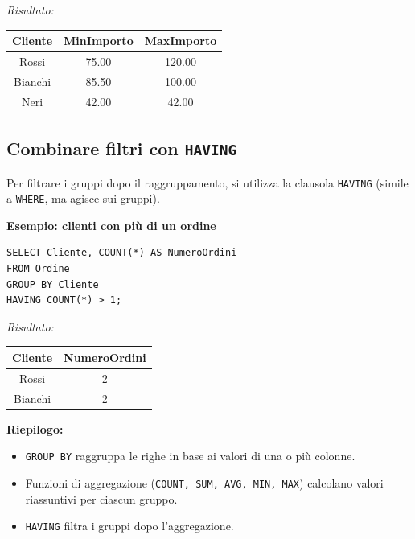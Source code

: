 \documentclass[a4paper,12pt]{article}
\newcommand{\code}[1]{\texttt{#1}}
\begin{document}
\textit{Risultato:}
\begin{center}
\begin{tabular}{|c|c|c|}
\hline
Cliente & MinImporto & MaxImporto \\
\hline
Rossi & 75.00 & 120.00 \\
Bianchi & 85.50 & 100.00 \\
Neri & 42.00 & 42.00 \\
\hline
\end{tabular}
\end{center}

\subsection{Combinare filtri con \code{HAVING}}
Per filtrare i gruppi dopo il raggruppamento, si utilizza la clausola \code{HAVING} (simile a \code{WHERE}, ma agisce sui gruppi).

\textbf{Esempio: clienti con più di un ordine}
\begin{verbatim}
SELECT Cliente, COUNT(*) AS NumeroOrdini
FROM Ordine
GROUP BY Cliente
HAVING COUNT(*) > 1;
\end{verbatim}

\textit{Risultato:}
\begin{center}
\begin{tabular}{|c|c|}
\hline
Cliente & NumeroOrdini \\
\hline
Rossi & 2 \\
Bianchi & 2 \\
\hline
\end{tabular}
\end{center}

\bigskip
\textbf{Riepilogo:}
\begin{itemize}
    \item \code{GROUP BY} raggruppa le righe in base ai valori di una o più colonne.
    \item Funzioni di aggregazione (\code{COUNT, SUM, AVG, MIN, MAX}) calcolano valori riassuntivi per ciascun gruppo.
    \item \code{HAVING} filtra i gruppi dopo l’aggregazione.
\end{itemize}















\end{document}
